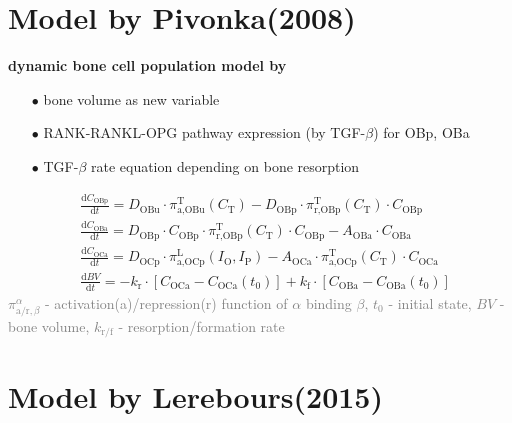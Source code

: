 \documentclass[%
aspectratio=169,  %
]{beamer}
\begin{document}
\section*{Model by Pivonka(2008)}
\begin{frame}
\textbf{dynamic bone cell population model by \cite{Pivonka.2008}}
\begin{itemize}
\item [$\bullet$]  bone volume as new variable
\item [$\bullet$] RANK-RANKL-OPG pathway expression (by TGF-$\beta$) for OBp, OBa
\item[$\bullet$] TGF-$\beta$ rate equation depending on bone resorption
\end{itemize}
\begin{subequations}
	\begin{align}
		& \frac{\text{d} C_\text{OBp}}{\text{d} t} =  D_\text{OBu} \cdot \pi_{\text{a,OBu}}^\text{T} (C_\text{T})-  D_\text{OBp}  \cdot \pi_{\text{r,OBp}}^\text{T}(C_\text{T})  \cdot C_\text{OBp}\\
		& \frac{\text{d} C_\text{OBa}}{\text{d} t} =   D_\text{OBp} \cdot  C_\text{OBp} \cdot  \pi_{\text{r,OBp}}^\text{T} (C_\text{T})  \cdot  C_\text{OBp}-  A_\text{OBa}  \cdot C_\text{OBa}\\ 
		& \frac{\text{d} C_\text{OCa}}{\text{d} t} =  D_\text{OCp} \cdot \pi_{\text{a,OCp}}^{\text{L}} (I_\text{O},I_\text{P})-  A_\text{OCa}  \cdot \pi_{\text{a,OCp}}^\text{T}(C_\text{T})  \cdot C_\text{OCa}   \\
		& \frac{\text{d} BV}{\text{d} t} = -k_\text{r} \cdot [C_\text{OCa} - C_\text{OCa}(t_0)] + k_\text{f} \cdot [C_\text{OBa} - C_\text{OBa}(t_0)]
	\end{align}
	\label{eq:model2}
\end{subequations}
\textcolor{gray}{$\pi^\alpha_{\text{a/r}, \beta}$ - activation(a)/repression(r) function of $\alpha$ binding $\beta$, $t_0$ - initial state, $BV$ - bone volume, $k_\text{r/f}$ - resorption/formation rate}
\end{frame}

\section*{Model by Lerebours(2015)}
\end{document}
